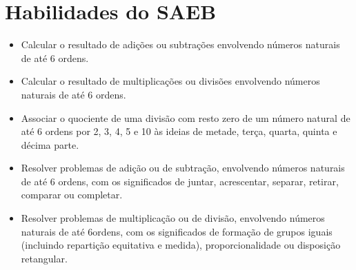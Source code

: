 \vspace*{-1.5cm}
\enlargethispage{3\baselineskip}

\section*{Habilidades do SAEB}

\begin{itemize}
\item Calcular o resultado de adições ou subtrações envolvendo números
naturais de até 6 ordens.

\item Calcular o resultado de multiplicações ou divisões envolvendo números
naturais de até 6 ordens.

\item Associar o quociente de uma divisão com resto zero de um número
natural de até 6 ordens por 2, 3, 4, 5 e 10 às ideias de metade, terça,
quarta, quinta e décima parte.

\item Resolver problemas de adição ou de subtração, envolvendo números
naturais de até 6 ordens, com os significados de juntar, acrescentar,
separar, retirar, comparar ou completar.

\item Resolver problemas de multiplicação ou de divisão, envolvendo números
naturais de até 6ordens, com os significados de formação de grupos
iguais (incluindo repartição equitativa e medida), proporcionalidade ou
disposição retangular.
\end{itemize}

